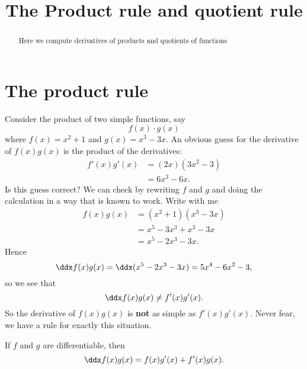 \documentclass{ximera}
\title[Dig-In:]{The Product rule and quotient rule}
\begin{document}
\begin{abstract}
Here we compute derivatives of products and quotients of functions
\end{abstract}
\maketitle


\section{The product rule}


Consider the product of two simple functions, say
\[
f(x)\cdot g(x)
\]
where $f(x)=x^2+1$ and $g(x)=x^3-3x$. An obvious guess for the
derivative of $f(x)g(x)$ is the product of the derivatives:
\begin{align*}
f'(x)g'(x) &= (2x)(3x^2-3)\\
&= 6x^3-6x.
\end{align*}
Is this guess correct? We can check by rewriting $f$ and $g$ and doing
the calculation in a way that is known to work. Write with me
\begin{align*}
f(x)g(x) &= (x^2+1)(x^3-3x)\\
&=x^5-3x^3+x^3-3x\\
&=x^5-2x^3-3x.
\end{align*} 
Hence
\[
\ddx f(x) g(x) = \ddx(x^5 - 2x^3 - 3x) = 5x^4-6x^2-3, 
\]
so we see that 
\[
\ddx f(x) g(x) \ne  f'(x)g'(x).
\]
So the derivative of $f(x)g(x)$ is \textbf{not} as simple as
$f'(x)g'(x)$. Never fear, we have a rule for exactly this
situation.
\begin{theorem}\label{theorem:product-rule}
If $f$ and $g$ are differentiable, then
\[
\ddx f(x)g(x) = f(x)g'(x)+f'(x)g(x).
\]
\end{theorem}

\end{document}
